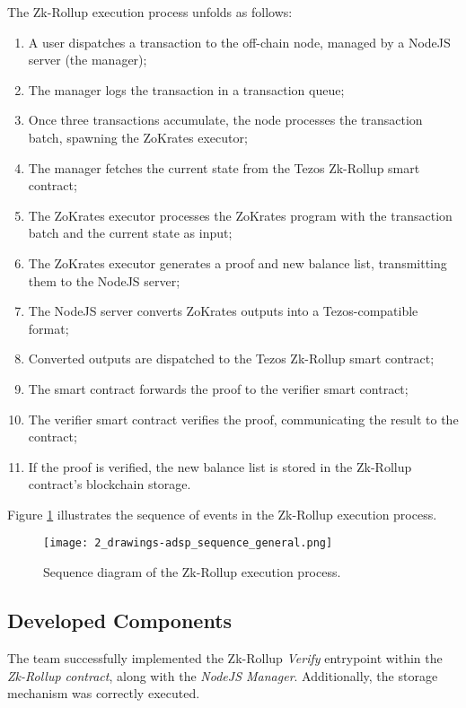 The Zk-Rollup execution process unfolds as follows:
\begin{enumerate}
    \item A user dispatches a transaction to the off-chain node, managed by a NodeJS server (the manager);
    \item The manager logs the transaction in a transaction queue;
    \item Once three transactions accumulate, the node processes the transaction batch, spawning the ZoKrates executor;
    \item The manager fetches the current state from the Tezos Zk-Rollup smart contract;
    \item The ZoKrates executor processes the ZoKrates program with the transaction batch and the current state as input;
    \item The ZoKrates executor generates a proof and new balance list, transmitting them to the NodeJS server;
    \item The NodeJS server converts ZoKrates outputs into a Tezos-compatible format;
    \item Converted outputs are dispatched to the Tezos Zk-Rollup smart contract;
    \item The smart contract forwards the proof to the verifier smart contract;
    \item The verifier smart contract verifies the proof, communicating the result to the contract;
    \item If the proof is verified, the new balance list is stored in the Zk-Rollup contract's blockchain storage.
\end{enumerate}

Figure \ref{fig:2_drawings-adsp_sequence_general.png} illustrates the sequence of events in the Zk-Rollup execution process.

\begin{figure}[ht]
  \centering
  \texttt{[image: 2\_drawings-adsp\_sequence\_general.png]}
  \caption[Scaling Solutions]{Sequence diagram of the Zk-Rollup execution process.}  
  \label{fig:2_drawings-adsp_sequence_general.png}
\end{figure} 

\subsection{Developed Components}
The team successfully implemented the Zk-Rollup \textit{Verify} entrypoint within the \textit{Zk-Rollup contract}, along with the \textit{NodeJS Manager}. Additionally, the storage mechanism was correctly executed.

